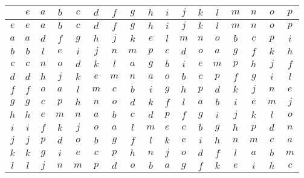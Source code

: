 \documentclass[12pt]{amsart}
\begin{document}
\begin{center}\begin{tabular}{c|cccccccccccccccc}
	&\(e\) &\(a\) &\(b\) &\(c\) &\(d\) &\(f\) &\(g\) &\(h\) &\(i\) &\(j\) &\(k\) &\(l\) &\(m\) &\(n\) &\(o\) &\(p\) \\\hline
	\(e\)  & \(e\)  & \(a\)  & \(b\)  & \(c\)  & \(d\)  & \(f\)  & \(g\)  & \(h\)  & \(i\)  & \(j\)  & \(k\)  & \(l\)  & \(m\)  & \(n\)  & \(o\)  & \(p\)  \\
	\(a\)  & \(a\)  & \(d\)  & \(f\)  & \(g\)  & \(h\)  & \(j\)  & \(k\)  & \(e\)  & \(l\)  & \(m\)  & \(n\)  & \(o\)  & \(b\)  & \(c\)  & \(p\)  & \(i\)  \\
	\(b\)  & \(b\)  & \(l\)  & \(e\)  & \(i\)  & \(j\)  & \(n\)  & \(m\)  & \(p\)  & \(c\)  & \(d\)  & \(o\)  & \(a\)  & \(g\)  & \(f\)  & \(k\)  & \(h\)  \\
	\(c\)  & \(c\)  & \(n\)  & \(o\)  & \(d\)  & \(k\)  & \(l\)  & \(a\)  & \(g\)  & \(b\)  & \(i\)  & \(e\)  & \(m\)  & \(p\)  & \(h\)  & \(j\)  & \(f\)  \\
	\(d\)  & \(d\)  & \(h\)  & \(j\)  & \(k\)  & \(e\)  & \(m\)  & \(n\)  & \(a\)  & \(o\)  & \(b\)  & \(c\)  & \(p\)  & \(f\)  & \(g\)  & \(i\)  & \(l\)  \\
	\(f\)  & \(f\)  & \(o\)  & \(a\)  & \(l\)  & \(m\)  & \(c\)  & \(b\)  & \(i\)  & \(g\)  & \(h\)  & \(p\)  & \(d\)  & \(k\)  & \(j\)  & \(n\)  & \(e\)  \\
	\(g\)  & \(g\)  & \(c\)  & \(p\)  & \(h\)  & \(n\)  & \(o\)  & \(d\)  & \(k\)  & \(f\)  & \(l\)  & \(a\)  & \(b\)  & \(i\)  & \(e\)  & \(m\)  & \(j\)  \\
	\(h\)  & \(h\)  & \(e\)  & \(m\)  & \(n\)  & \(a\)  & \(b\)  & \(c\)  & \(d\)  & \(p\)  & \(f\)  & \(g\)  & \(i\)  & \(j\)  & \(k\)  & \(l\)  & \(o\)  \\
	\(i\)  & \(i\)  & \(f\)  & \(k\)  & \(j\)  & \(o\)  & \(a\)  & \(l\)  & \(m\)  & \(e\)  & \(c\)  & \(b\)  & \(g\)  & \(h\)  & \(p\)  & \(d\)  & \(n\)  \\
	\(j\)  & \(j\)  & \(p\)  & \(d\)  & \(o\)  & \(b\)  & \(g\)  & \(f\)  & \(l\)  & \(k\)  & \(e\)  & \(i\)  & \(h\)  & \(n\)  & \(m\)  & \(c\)  & \(a\)  \\
	\(k\)  & \(k\)  & \(g\)  & \(i\)  & \(e\)  & \(c\)  & \(p\)  & \(h\)  & \(n\)  & \(j\)  & \(o\)  & \(d\)  & \(f\)  & \(l\)  & \(a\)  & \(b\)  & \(m\)  \\
	\(l\)  & \(l\)  & \(j\)  & \(n\)  & \(m\)  & \(p\)  & \(d\)  & \(o\)  & \(b\)  & \(a\)  & \(g\)  & \(f\)  & \(k\)  & \(e\)  & \(i\)  & \(h\)  & \(c\)  \\

\end{tabular}
\end{center}
\end{document}
